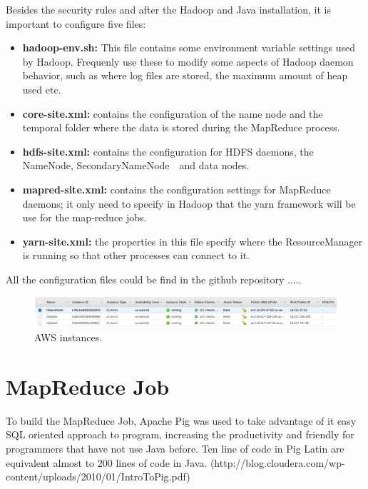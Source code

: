 \documentclass{article}
\newcommand*\setcaptioncitation[1]{\def\captioncitation{\textit{Source:}~#1}}
\let\captioncitation\relax
\begin{document}
        Besides the security rules and after the Hadoop and Java installation, it is important to configure five files:
            \begin{itemize}
                \item \textbf{hadoop-env.sh:} This file contains some environment variable settings used by Hadoop. Frequenly use these to modify some aspects of Hadoop daemon behavior, such as where 
                log files are stored, the maximum amount of heap used etc.                
                \item \textbf{core-site.xml:} contains the configuration of the name node and the temporal folder where the data is stored during the MapReduce process.
                \item \textbf{hdfs-site.xml:} contains the configuration for HDFS daemons, the NameNode, SecondaryNameNode  and data nodes.
                \item \textbf{mapred-site.xml:} contains the configuration settings for MapReduce daemons; it only need to specify in Hadoop that the yarn framework will be use for the map‐reduce jobs.
                \item \textbf{yarn-site.xml:} the properties in this file specify where the ResourceManager is running so that other processes can connect to it.
            \end{itemize}
        All the configuration files could be find in the github repository .....
        \begin{figure}[H]
            \centering 
            \includegraphics[width=1\linewidth]{./img/instances.png}
            \setcaptioncitation{Screenshot idk.}
            \caption{AWS instances.}
            \label{fig:instances}
        \end{figure}
        \section{MapReduce Job}

        To build the MapReduce Job, Apache Pig was used to take advantage of it easy SQL oriented approach to program, increasing the productivity and friendly for programmers that have not use Java before.
        Ten line of code in Pig Latin are equivalent almost to 200 lines of code in Java. (http://blog.cloudera.com/wp-content/uploads/2010/01/IntroToPig.pdf)
\end{document}
